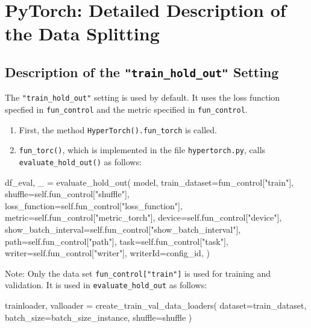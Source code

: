 \documentclass[
  letterpaper,
  DIV=11,
  numbers=noendperiod]{scrreprt}
\newenvironment{Shaded}{\begin{snugshade}}{\end{snugshade}}
\newcommand{\NormalTok}[1]{\textcolor[rgb]{0.00,0.23,0.31}{#1}}
\providecommand{\tightlist}{%
  \setlength{\itemsep}{0pt}\setlength{\parskip}{0pt}}\usepackage{longtable,booktabs,array}
\begin{document}
\newpage{}

\section{PyTorch: Detailed Description of the Data
Splitting}\label{sec-detailed-data-splitting}

\subsection{\texorpdfstring{Description of the
\texttt{"train\_hold\_out"}
Setting}{Description of the "train\_hold\_out" Setting}}\label{description-of-the-train_hold_out-setting}

The \texttt{"train\_hold\_out"} setting is used by default. It uses the
loss function specfied in \texttt{fun\_control} and the metric specified
in \texttt{fun\_control}.

\begin{enumerate}
\def\labelenumi{\arabic{enumi}.}
\tightlist
\item
  First, the method \texttt{HyperTorch().fun\_torch} is called.
\item
  \texttt{fun\_torc()}, which is implemented in the file
  \texttt{hypertorch.py}, calls \texttt{evaluate\_hold\_out()} as
  follows:
\end{enumerate}

\begin{Shaded}
\begin{Highlighting}[]
\NormalTok{df\_eval, \_ = evaluate\_hold\_out(}
\NormalTok{    model,}
\NormalTok{    train\_dataset=fun\_control["train"],}
\NormalTok{    shuffle=self.fun\_control["shuffle"],}
\NormalTok{    loss\_function=self.fun\_control["loss\_function"],}
\NormalTok{    metric=self.fun\_control["metric\_torch"],}
\NormalTok{    device=self.fun\_control["device"],}
\NormalTok{    show\_batch\_interval=self.fun\_control["show\_batch\_interval"],}
\NormalTok{    path=self.fun\_control["path"],}
\NormalTok{    task=self.fun\_control["task"],}
\NormalTok{    writer=self.fun\_control["writer"],}
\NormalTok{    writerId=config\_id,}
\NormalTok{)}
\end{Highlighting}
\end{Shaded}

Note: Only the data set \texttt{fun\_control{[}"train"{]}} is used for
training and validation. It is used in \texttt{evaluate\_hold\_out} as
follows:

\begin{Shaded}
\begin{Highlighting}[]
\NormalTok{trainloader, valloader = create\_train\_val\_data\_loaders(}
\NormalTok{                dataset=train\_dataset, batch\_size=batch\_size\_instance, shuffle=shuffle}
\NormalTok{            )}
\end{Highlighting}
\end{Shaded}
\end{document}
